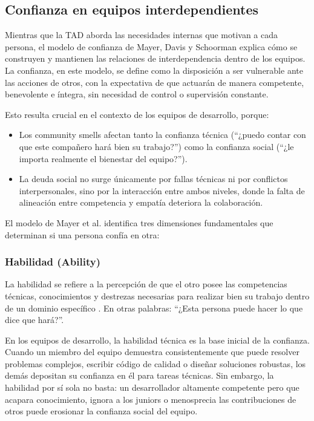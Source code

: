 \subsection{Confianza en equipos interdependientes}

Mientras que la TAD aborda las necesidades internas que motivan a cada persona, el modelo de confianza de Mayer, Davis y Schoorman \cite{mayer_integrative_1995} explica cómo se construyen y mantienen las relaciones de interdependencia dentro de los equipos. La confianza, en este modelo, se define como la disposición a ser vulnerable ante las acciones de otros, con la expectativa de que actuarán de manera competente, benevolente e íntegra, sin necesidad de control o supervisión constante.

Esto resulta crucial en el contexto de los equipos de desarrollo, porque:

\begin{itemize}
    \item Los community smells afectan tanto la confianza técnica (``¿puedo contar con que este compañero hará bien su trabajo?'') como la confianza social (``¿le importa realmente el bienestar del equipo?'').
    \item La deuda social no surge únicamente por fallas técnicas ni por conflictos interpersonales, sino por la interacción entre ambos niveles, donde la falta de alineación entre competencia y empatía deteriora la colaboración.
\end{itemize}

El modelo de Mayer et al. identifica tres dimensiones fundamentales que determinan si una persona confía en otra:

\subsubsection{Habilidad (Ability)}

La habilidad se refiere a la percepción de que el otro posee las competencias técnicas, conocimientos y destrezas necesarias para realizar bien su trabajo dentro de un dominio específico \cite{mayer_integrative_1995}. En otras palabras: ``¿Esta persona puede hacer lo que dice que hará?''.

En los equipos de desarrollo, la habilidad técnica es la base inicial de la confianza. Cuando un miembro del equipo demuestra consistentemente que puede resolver problemas complejos, escribir código de calidad o diseñar soluciones robustas, los demás depositan su confianza en él para tareas técnicas. Sin embargo, la habilidad por sí sola no basta: un desarrollador altamente competente pero que acapara conocimiento, ignora a los juniors o menosprecia las contribuciones de otros puede erosionar la confianza social del equipo.

